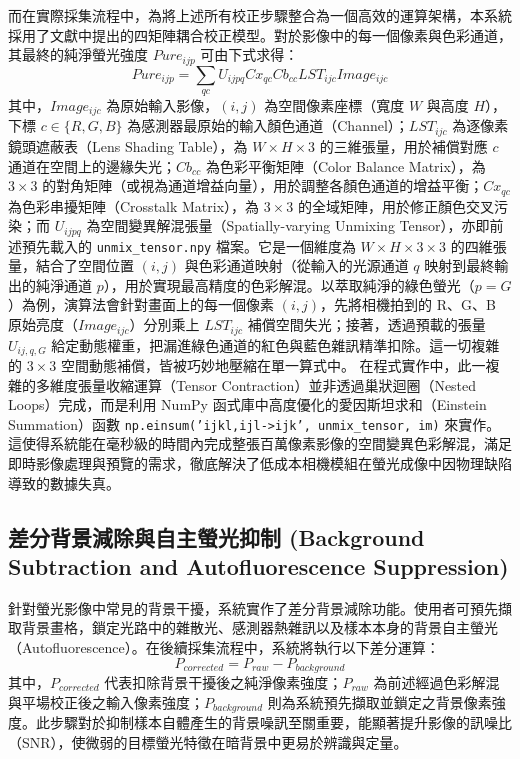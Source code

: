 而在實際採集流程中，為將上述所有校正步驟整合為一個高效的運算架構，本系統採用了文獻中提出的四矩陣耦合校正模型。對於影像中的每一個像素與色彩通道，其最終的純淨螢光強度 $Pure_{ijp}$ 可由下式求得：
\begin{equation}
    Pure_{ijp} = \sum_{qc} U_{ijpq} Cx_{qc} Cb_{cc} LST_{ijc} Image_{ijc}
\end{equation}
其中，$Image_{ijc}$ 為原始輸入影像，$(i, j)$ 為空間像素座標（寬度 $W$ 與高度 $H$），下標 $c \in \{R, G, B\}$ 為感測器最原始的輸入顏色通道（Channel）；$LST_{ijc}$ 為逐像素鏡頭遮蔽表（Lens Shading Table），為 $W \times H \times 3$ 的三維張量，用於補償對應 $c$ 通道在空間上的邊緣失光；$Cb_{cc}$ 為色彩平衡矩陣（Color Balance Matrix），為 $3 \times 3$ 的對角矩陣（或視為通道增益向量），用於調整各顏色通道的增益平衡；$Cx_{qc}$ 為色彩串擾矩陣（Crosstalk Matrix），為 $3 \times 3$ 的全域矩陣，用於修正顏色交叉污染；而 $U_{ijpq}$ 為空間變異解混張量（Spatially-varying Unmixing Tensor），亦即前述預先載入的 \texttt{unmix\_tensor.npy} 檔案。它是一個維度為 $W \times H \times 3 \times 3$ 的四維張量，結合了空間位置 $(i, j)$ 與色彩通道映射（從輸入的光源通道 $q$ 映射到最終輸出的純淨通道 $p$），用於實現最高精度的色彩解混。以萃取純淨的綠色螢光（$p=G$）為例，演算法會針對畫面上的每一個像素 $(i, j)$，先將相機拍到的 R、G、B 原始亮度（$Image_{ijc}$）分別乘上 $LST_{ijc}$ 補償空間失光；接著，透過預載的張量 $U_{ij, q, G}$ 給定動態權重，把漏進綠色通道的紅色與藍色雜訊精準扣除。這一切複雜的 $3 \times 3$ 空間動態補償，皆被巧妙地壓縮在單一算式中。
在程式實作中，此一複雜的多維度張量收縮運算（Tensor Contraction）並非透過巢狀迴圈（Nested Loops）完成，而是利用 NumPy 函式庫中高度優化的愛因斯坦求和（Einstein Summation）函數 \texttt{np.einsum('ijkl,ijl->ijk', unmix\_tensor, im)} 來實作。這使得系統能在毫秒級的時間內完成整張百萬像素影像的空間變異色彩解混，滿足即時影像處理與預覽的需求，徹底解決了低成本相機模組在螢光成像中因物理缺陷導致的數據失真。

\subsection{差分背景減除與自主螢光抑制 (Background Subtraction and Autofluorescence Suppression)}

針對螢光影像中常見的背景干擾，系統實作了差分背景減除功能。使用者可預先擷取背景畫格，鎖定光路中的雜散光、感測器熱雜訊以及樣本本身的背景自主螢光（Autofluorescence）。在後續採集流程中，系統將執行以下差分運算：
\begin{equation}
    P_{corrected} = P_{raw} - P_{background}
    \label{eq:background_subtraction}
\end{equation}
其中，$P_{corrected}$ 代表扣除背景干擾後之純淨像素強度；$P_{raw}$ 為前述經過色彩解混與平場校正後之輸入像素強度；$P_{background}$ 則為系統預先擷取並鎖定之背景像素強度。此步驟對於抑制樣本自體產生的背景噪訊至關重要，能顯著提升影像的訊噪比（SNR），使微弱的目標螢光特徵在暗背景中更易於辨識與定量。


